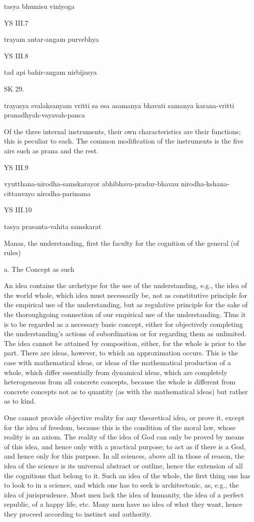     tasya bhumisu viniyoga

YS III.7

    trayam antar-angam purvebhya

YS III.8

    tad api bahir-angam nirbijasya

SK 29.

trayasya svalaksanyam vritti sa esa asamanya bhavati
samanya karana-vritti pranadhyah-vayavah-panca

Of the three internal instruments, their own characteristics are their functions;
this is peculiar to each.
The common modification of the instruments is the five airs
such as prana and the rest.

YS III.9

    vyutthana-nirodha-samskarayor abhibhava-pradur-bhavau nirodha-kshana-cittanvayo nirodha-parinama

YS III.10

    tasya prasanta-vahita samskarat

    Manas, the understanding, first the faculty for the cognition of the general (of rules)

    a. The Concept as such

    An idea contains the archetype for the use of the understanding, e.g.,
    the idea of the world whole, which idea must necessarily be,
    not as constitutive principle for the empirical use of the understanding,
    but as regulative principle for the sake of the thoroughgoing connection of
    our empirical use of the understanding.
    Thus it is to be regarded as a necessary basic concept,
    either for objectively completing the understanding's actions of
    subordination or for regarding them as unlimited.
    The idea cannot be attained by composition, either,
    for the whole is prior to the part.
    There are ideas, however, to which an approximation occurs.
    This is the case with mathematical ideas,
    or ideas of the mathematical production of a whole,
    which differ essentially from dynamical ideas,
    which are completely heterogeneous from all concrete concepts,
    because the whole is different from concrete concepts
    not as to quantity (as with the mathematical ideas)
    but rather as to kind.

    One cannot provide objective reality for any theoretical idea, or prove it,
    except for the idea of freedom, because this is the condition of the moral law,
    whose reality is an axiom.
    The reality of the idea of God can only be proved by means of this idea, and
    hence only with a practical purpose;
    to act as if there is a God, and hence only for this purpose.
    In all sciences, above all in those of reason, the idea of the science is
    its universal abstract or outline, hence the extension of all the cognitions
    that belong to it.
    Such an idea of the whole, the first thing one has to look to in a science, and
    which one has to seek is architectonic, as, e.g., the idea of jurisprudence.
    Most men lack the idea of humanity, the idea of a perfect republic,
    of a happy life, etc.
    Many men have no idea of what they want,
    hence they proceed according to instinct and authority.

